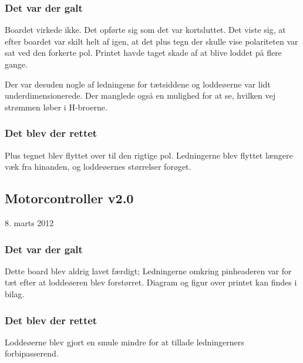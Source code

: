 \documentclass[a4paper,oneside,article,danish,table]{memoir}
\newcommand{\boarddate}[1]{\textcolor{blue!80!black}{#1}}
\begin{document}
\subsubsection{Det var der galt}
Boardet virkede ikke. Det opførte sig som det var kortsluttet. Det viste sig, at efter boardet var skilt helt af igen, at det plus tegn der skulle vise polariteten var sat ved den forkerte pol. Printet havde taget skade af at blive loddet på flere gange.

Der var desuden nogle af ledningene for tætsiddene og loddeøerne var lidt underdimensionerede. Der manglede også en mulighed for at se, hvilken vej strømmen løber i H-broerne.
\subsubsection{Det blev der rettet}
Plus tegnet blev flyttet over til den rigtige pol. Ledningerne blev flyttet længere væk fra hinanden, og loddeøernes størrelser forøget.

\subsection{Motorcontroller v2.0}
\boarddate{8. marts 2012} 
\subsubsection{Det var der galt}
Dette board blev aldrig lavet færdigt; Ledningerne omkring pinheaderen var for tæt efter at loddeøeren blev forstørret. Diagram og figur over printet kan findes i bilag. 

\subsubsection{Det blev der rettet}
Loddeøerne blev gjort en smule mindre for at tillade ledningerners forbipasserend.
\end{document}

